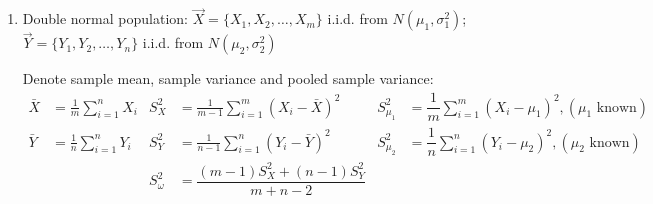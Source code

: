 \begin{enumerate}




    \item Double normal population: $\vec{X}=\{X_1,X_2,\ldots,X_m\}$ i.i.d. from $N(\mu_1,\sigma_1^2)$; $\vec{Y}=\{Y_1,Y_2,\ldots,Y_n\}$ i.i.d. from $N(\mu_2,\sigma^2_2)$

    
    Denote sample mean, sample variance and pooled sample variance:
\begin{align*}
    \bar{X}&=\frac{1}{m}\sum_{i=1}^nX_i &S_X^2&=\frac{1}{m-1}\sum_{i=1}^m(X_i-\bar{X})^2& S_{\mu_1}^2 &=\dfrac{1}{m}\sum_{i=1}^m(X_i-\mu_1)^2,(\mu_1\text{ known}) \\\bar{Y}&=\frac{1}{n}\sum_{i=1}^n Y_i&S^2_Y&=\frac{1}{n-1}\sum_{i=1}^n(Y_i-\bar{Y})^2& S_{\mu_2}^2 &=\dfrac{1}{n}\sum_{i=1}^n(Y_i-\mu_2)^2,(\mu_2\text{ known})\\
    &&S_\omega^2&=\dfrac{(m-1)S_X^2+(n-1)S_Y^2}{m+n-2}&&
\end{align*}




\end{enumerate}
